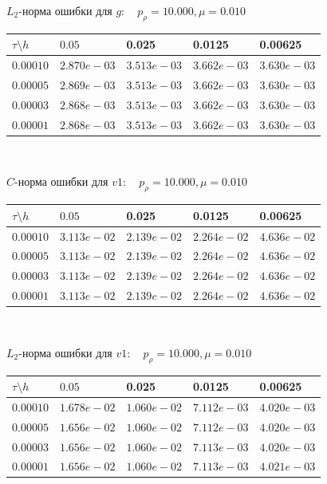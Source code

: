 \documentclass[a4paper, 25pt]{article}
\begin{document}
\begin{center}
 $L_2$-норма ошибки для $g: \quad p_{\rho}=10.000, \mu = 0.010 $
\begin{tabular}{|p{0.6in}|p{0.7in}|p{0.7in}|p{0.7in}|p{0.7in}|} \hline
$\tau\setminus h$ & $0.05$ & 0.025& 0.0125 & 0.00625 \\ \hline
$0.00010$ & $2.870e-03$ &$3.513e-03$ &$3.662e-03$ &$3.630e-03$  \\ \hline
$0.00005$ & $2.869e-03$ &$3.513e-03$ &$3.662e-03$ &$3.630e-03$  \\ \hline
$0.00003$ & $2.868e-03$ &$3.513e-03$ &$3.662e-03$ &$3.630e-03$  \\ \hline
$0.00001$ & $2.868e-03$ &$3.513e-03$ &$3.662e-03$ &$3.630e-03$  \\ \hline
\end{tabular}\\[20pt]
\end{center}

\begin{center}
$C$-норма ошибки для $v1: \quad p_{\rho}=10.000, \mu = 0.010 $
\begin{tabular}{|p{0.6in}|p{0.7in}|p{0.7in}|p{0.7in}|p{0.7in}|} \hline
$\tau\setminus h$ & $0.05$ & 0.025& 0.0125 & 0.00625 \\ \hline
$0.00010$ & $3.113e-02$ &$2.139e-02$ &$2.264e-02$ &$4.636e-02$  \\ \hline
$0.00005$ & $3.113e-02$ &$2.139e-02$ &$2.264e-02$ &$4.636e-02$  \\ \hline
$0.00003$ & $3.113e-02$ &$2.139e-02$ &$2.264e-02$ &$4.636e-02$  \\ \hline
$0.00001$ & $3.113e-02$ &$2.139e-02$ &$2.264e-02$ &$4.636e-02$  \\ \hline
\end{tabular}\\[20pt]
\end{center}

\begin{center}
 $L_2$-норма ошибки для $v1: \quad p_{\rho}=10.000, \mu = 0.010 $
\begin{tabular}{|p{0.6in}|p{0.7in}|p{0.7in}|p{0.7in}|p{0.7in}|} \hline
$\tau\setminus h$ & $0.05$ & 0.025& 0.0125 & 0.00625 \\ \hline
$0.00010$ & $1.678e-02$ &$1.060e-02$ &$7.112e-03$ &$4.020e-03$  \\ \hline
$0.00005$ & $1.656e-02$ &$1.060e-02$ &$7.112e-03$ &$4.020e-03$  \\ \hline
$0.00003$ & $1.656e-02$ &$1.060e-02$ &$7.113e-03$ &$4.020e-03$  \\ \hline
$0.00001$ & $1.656e-02$ &$1.060e-02$ &$7.113e-03$ &$4.021e-03$  \\ \hline
\end{tabular}\\[20pt]
\end{center}
\end{document}
